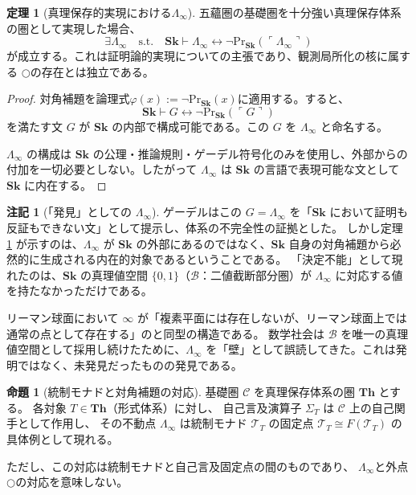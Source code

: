 \documentclass[11pt,a4paper]{ltjsarticle}
\theoremstyle{definition}
\newtheorem{theorem}{定理}[section]
\newtheorem{proposition}{命題}[section]
\newtheorem{remark}{注記}[section]
\newcommand{\Sk}{\mathbf{Sk}}
\newcommand{\T}{\mathcal{T}}
\newcommand{\PrSk}{\mathrm{Pr}_{\Sk}}
\newcommand{\LawvereInfinity}{\Lambda_\infty}
\begin{document}
\begin{theorem}[真理保存的実現における$\LawvereInfinity$]\label{thm:e-infinity-existence}
五蘊圏の基礎圏を十分強い真理保存体系の圏として実現した場合、
\begin{equation}
\exists \LawvereInfinity \quad \text{s.t.} \quad 
\Sk \vdash \LawvereInfinity \leftrightarrow \neg\PrSk(\ulcorner \LawvereInfinity \urcorner)
\end{equation}
が成立する。これは証明論的実現についての主張であり、観測局所化の核に属する
$\bigcirc$の存在とは独立である。
\end{theorem}
\begin{proof}
対角補題を論理式$\varphi(x):=\neg\PrSk(x)$に適用する。すると、
\begin{equation}
\Sk \vdash G \leftrightarrow \neg\PrSk(\ulcorner G \urcorner)
\end{equation}
を満たす文 $G$ が $\Sk$ の内部で構成可能である。この $G$ を $\LawvereInfinity$ と命名する。

$\LawvereInfinity$ の構成は $\Sk$ の公理・推論規則・ゲーデル符号化のみを使用し、外部からの付加を一切必要としない。したがって $\LawvereInfinity$ は $\Sk$ の言語で表現可能な文として $\Sk$ に内在する。
\end{proof}

\begin{remark}[「発見」としての $\LawvereInfinity$]\label{rem:e-infinity-discovery}
ゲーデルはこの $G = \LawvereInfinity$ を「$\Sk$ において証明も反証もできない文」として提示し、体系の不完全性の証拠とした。
しかし定理 \ref{thm:e-infinity-existence} が示すのは、$\LawvereInfinity$ が $\Sk$ の外部にあるのではなく、$\Sk$ 自身の対角補題から必然的に生成される内在的対象であるということである。
「決定不能」として現れたのは、$\Sk$ の真理値空間 $\{0,1\}$（$\mathcal{B}$：二値截断部分圏）が $\LawvereInfinity$ に対応する値を持たなかっただけである。

リーマン球面において $\infty$ が「複素平面には存在しないが、リーマン球面上では通常の点として存在する」のと同型の構造である。
数学社会は $\mathcal{B}$ を唯一の真理値空間として採用し続けたために、$\LawvereInfinity$ を「壁」として誤読してきた。これは発明ではなく、未発見だったものの発見である。
\end{remark}

\begin{proposition}[統制モナドと対角補題の対応]\label{prop:monad-diagonal}
基礎圏 $\mathcal{C}$ を真理保存体系の圏 $\mathbf{Th}$ とする。
各対象 $T \in \mathbf{Th}$（形式体系）に対し、
自己言及演算子 $\Sigma_T$ は $\mathcal{C}$ 上の自己関手として作用し、
その不動点 $\LawvereInfinity$ は統制モナド $\T_T$ の固定点
$\T_T \cong F(\T_T)$ の具体例として現れる。

ただし、この対応は統制モナドと自己言及固定点の間のものであり、
$\LawvereInfinity$と外点$\bigcirc$の対応を意味しない。
\end{proposition}
\end{document}
